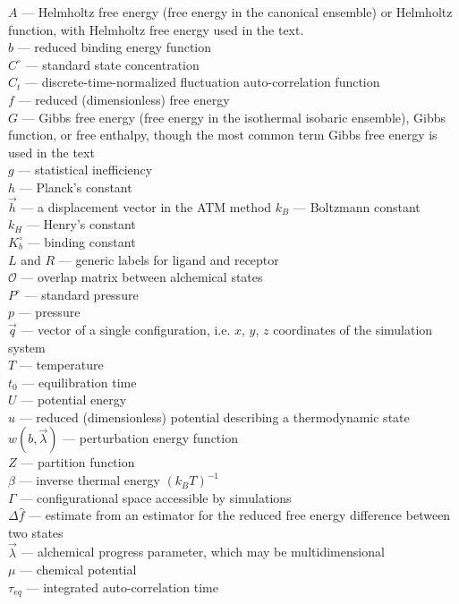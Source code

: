 \documentclass[9pt,bestpractices]{livecoms}
\begin{document}
\begin{tcolorbox}[title=List of Symbols, colback=green!10!white]
$A$ --- Helmholtz free energy (free energy in the canonical ensemble) or Helmholtz function, with Helmholtz free energy used in the text.\\
$b$ --- reduced binding energy function \\
$C^{\circ}$ --- standard state concentration \\
$C_t$ --- discrete-time-normalized fluctuation auto-correlation function\\
$f$ --- reduced (dimensionless) free energy \\
$G$ --- Gibbs free energy (free energy in the isothermal isobaric ensemble), Gibbs function, or free enthalpy, though the most common term Gibbs free energy is used in the text\\
$g$ --- statistical inefficiency\\
$h$ --- Planck's constant \\
$\vec{h}$ --- a displacement vector in the ATM method
$k_B$ --- Boltzmann constant \\
$k_H$ --- Henry's constant \\
$K_b^{\circ}$ --- binding  constant \\
$L$ and $R$ --- generic labels for ligand and receptor\\
$\mathcal{O}$ --- overlap matrix between alchemical states\\
$P^{\circ}$ --- standard pressure \\
$p$ --- pressure \\
$\vec{q}$ --- vector of a single configuration, i.e. $x$, $y$, $z$ coordinates of the simulation system\\
$T$ --- temperature \\
$t_0$ --- equilibration time \\
$U$ --- potential energy\\
$u$ --- reduced (dimensionless) potential describing a thermodynamic state \\
$w(b, \vec{\lambda})$ --- perturbation energy function \\
$Z$ --- partition function \\
$\beta$ --- inverse thermal energy $(k_B T)^{-1}$ \\
$\Gamma$ --- configurational space accessible by simulations \\
$\Delta \hat{f}$ --- estimate from an estimator for the reduced free energy difference between two states\\
$\vec{\lambda}$ --- alchemical progress parameter, which may be multidimensional \\
$\mu$ --- chemical potential\\
$\tau _{eq}$ --- integrated auto-correlation time\\
\end{tcolorbox}
\end{document}

